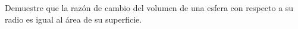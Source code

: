 \item Demuestre que la razón de cambio del volumen de una esfera con respecto a su radio es igual al área de su superficie.
